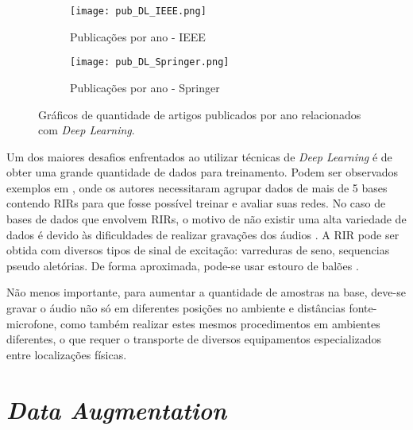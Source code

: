 \begin{figure} [H]
    \begin{subfigure}{1\textwidth}
        \centering
        \texttt{[image: pub\_DL\_IEEE.png]}
        \caption{Publicações por ano - IEEE}    
    \end{subfigure}
    \begin{subfigure}{1\textwidth}
        \centering
        \texttt{[image: pub\_DL\_Springer.png]}
        \caption{Publicações por ano - Springer\textregistered}    
    \end{subfigure}
    \caption{Gráficos de quantidade de artigos publicados por ano relacionados com \textit{Deep Learning}.}
    \label{fig:pub_DL}
\end{figure}


Um dos maiores desafios enfrentados ao utilizar técnicas de \textit{Deep Learning} é de obter uma grande quantidade de dados para treinamento.
Podem ser observados exemplos em \cite{Estimation_RT_DRR,ACE_Data_Aug_Eval}, onde os autores necessitaram agrupar dados de mais de 5 bases contendo
RIRs para que fosse possível treinar e avaliar suas redes.
No caso de bases de dados que envolvem RIRs, o motivo de não existir uma alta variedade de dados é devido às dificuldades
de realizar gravações dos áudios \cite{Recording_RIR_2}.
A RIR pode ser obtida com diversos tipos de sinal de excitação: varreduras de seno, sequencias pseudo aletórias. 
De forma aproximada, pode-se usar estouro de balões \cite{Recording_RIR}.

Não menos importante, para aumentar a quantidade de amostras na base, deve-se gravar o áudio não só em diferentes posições no ambiente
e distâncias fonte-microfone, como também realizar estes mesmos procedimentos em ambientes diferentes, o que requer o transporte de diversos equipamentos
especializados entre localizações físicas.

\section{\textit{Data Augmentation}}

